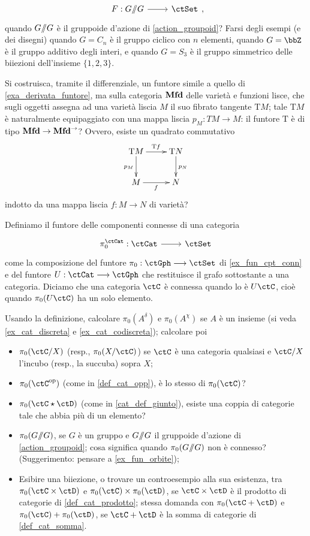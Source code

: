 \begin{esercizi}
	\[\dmFun F {\act G}\ctSet,\]
	quando \(G/\!\!/G\) è il gruppoide d'azione di \ref{action_groupoid}? Farsi degli esempi (e dei disegni) quando \(G=C_n\) è il gruppo ciclico con \(n\) elementi, quando \(G=\bbZ\) è il gruppo additivo degli interi, e quando \(G=S_3\) è il gruppo simmetrico delle biiezioni dell'insieme \(\{1,2,3\}\).
	\item \label{gfdpgubai_4} Si costruisca, tramite il differenziale, un funtore simile a quello di \ref{exa_derivata_funtore}, ma sulla categoria \(\mathbf{Mfd}\) delle varietà e funzioni lisce, che sugli oggetti assegna ad una varietà liscia \(M\) il suo fibrato tangente \(\text{T} M\); tale \(\text{T} M\) è naturalmente equipaggiato con una mappa liscia \(p_M : TM\to M\): il funtore \(\text{T}\) è di tipo \(\mathbf{Mfd} \to \mathbf{Mfd}^\to\)? Ovvero, esiste un quadrato commutativo
	\[\xymatrix{
		\text{T} M \ar[r]^{\text{T} f}\ar[d]_{p_M} & \text{T} N \ar[d]^{p_N}\\
		M \ar[r]_f & N
		}\]
	indotto da una mappa liscia \(f : M\to N\) di varietà?
	\item \label{exe_cpt_conn} Definiamo il funtore delle componenti connesse di una categoria
	\[\dmFun{\pi_0^\ctCat}{\ctCat}{\ctSet}\]
	come la composizione del funtore \(\pi_0 : \ctGph \fun\ctSet\) di \ref{ex_fun_cpt_conn} e del funtore \(U : \ctCat \fun\ctGph\) che restituisce il grafo sottostante a una categoria. Diciamo che una categoria \(\ctC\) è connessa quando lo è \(U\ctC\), cioè quando \(\pi_0(U\ctC)\) ha un solo elemento.

	Usando la definizione, calcolare \(\pi_0(A^\delta)\) e \(\pi_0(A^\chi)\) se \(A\) è un insieme (si veda \ref{ex_cat_discreta} e \ref{ex_cat_codiscreta}); calcolare poi
	\begin{itemize}
		\item \(\pi_0(\ctC/X)\) (resp., \(\pi_0(X/\ctC)\)) se \(\ctC\) è una categoria qualsiasi e \(\ctC/X\) l'incubo (resp., la succuba) sopra \(X\);
		\item \(\pi_0(\ctC^\op)\) (come in \ref{def_cat_opp}), è lo stesso di \(\pi_0(\ctC)\)?
		\item \(\pi_0(\ctC\star\ctD)\) (come in \ref{cat_def_giunto}), esiste una coppia di categorie tale che abbia più di un elemento?
		\item \(\pi_0(G/\!\!/G)\), se \(G\) è un gruppo e \(G/\!\!/G\) il gruppoide d'azione di \ref{action_groupoid}; cosa significa quando \(\pi_0(G/\!\!/G)\) non è connesso? (Suggerimento: pensare a \ref{ex_fun_orbite});
		\item Esibire una biiezione, o trovare un controesempio alla sua esistenza, tra \(\pi_0(\ctC\times\ctD)\) e \(\pi_0(\ctC)\times\pi_0(\ctD)\), se \(\ctC\times\ctD\) è il prodotto di categorie di \ref{def_cat_prodotto}; stessa domanda con \(\pi_0(\ctC+\ctD)\) e \(\pi_0(\ctC)+\pi_0(\ctD)\), se \(\ctC+\ctD\) è la somma di categorie di \ref{def_cat_somma}.
	\end{itemize}
\end{esercizi}
